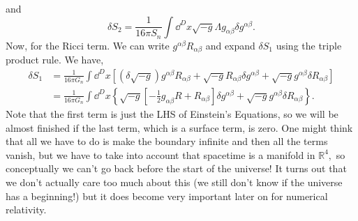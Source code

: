 \documentclass{article}
\numberwithin{equation}{section}
\begin{document}
 and 
 \begin{equation}
    \delta S_2 = \frac{1}{16\pi S_n}\int \dd^{D}{x}\sqrt{-g} \Lambda g_{\alpha \beta}\delta g^{\alpha\beta}.
 \end{equation}
 Now, for the Ricci term. We can write $g^{\alpha\beta}R_{\alpha\beta}$ and expand $\delta S_1$ using the triple product rule. We have,
 \begin{align}
    \delta S_1 &= \frac{1}{16\pi G_n}\int \dd^D x\left[(\delta \sqrt{-g})g^{\alpha\beta}R_{\alpha\beta}+\sqrt{-g}R_{\alpha\beta}\delta g^{\alpha\beta} + \sqrt{-g}g^{\alpha\beta}\delta R_{\alpha\beta}\right] \\ 
    &= \frac{1}{16\pi G_n}\int \dd^D{x} \left\{\sqrt{-g}\left[-\frac{1}{2}g_{\alpha\beta}R+R_{\alpha\beta}\right]\delta g^{\alpha\beta} + \sqrt{-g}g^{\alpha\beta}\delta R_{\alpha\beta}\right\}.
 \end{align}
 Note that the first term is just the LHS of Einstein's Equations, so we will be almost finished if the last term, which is a surface term, is zero. One might think that all we have to do is make the boundary infinite and then all the terms vanish, but we have to take into account that spacetime is a manifold in $\mathbb{R}^4,$ so conceptually we can't go back before the start of the universe! It turns out that we don't actually care too much about this (we still don't know if the universe has a beginning!) but it does become very important later on for numerical relativity.
\end{document}
